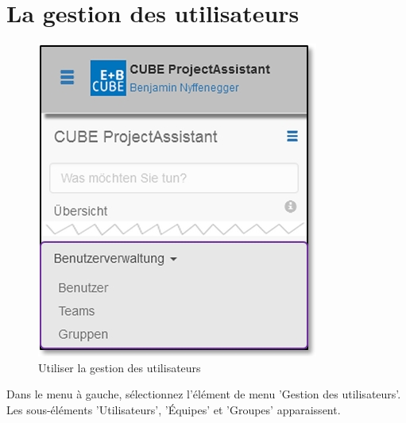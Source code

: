 
\clearpage
\section{La gestion des utilisateurs}

\begin{figure}   %
  \vspace{-35pt}      %
  \begin{center}
    \includegraphics[width=1\linewidth]{../chapters/14_Benutzerverwaltung/pictures/14_Menu_Benutzerverwaltung.jpg}
  \end{center}
  \vspace{-20pt}
  \caption{Utiliser la gestion des utilisateurs}
  \vspace{-10pt}
\end{figure}

Dans le menu à gauche, sélectionnez l'élément de menu 'Gestion des utilisateurs'. Les sous-éléments 'Utilisateurs', 'Équipes' et 'Groupes' apparaissent.

\vspace{\baselineskip}

